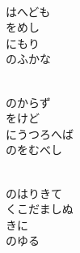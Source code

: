 \documentclass[10pt,b5j]{tarticle} %
\begin{document}
\vspace{1.5em} %
\newcommand{\linespace}{0.5em} %
\newcommand{\blocksize}{0.5\hsize} %
\newcommand{\itemmargin}{3em} %
\begin{enumerate} %
    \setlength{\itemindent}{\itemmargin} %
    \begin{minipage}[c]{\blocksize}
    
        \vspace{\linespace}
        \item~\\
        はへども\\
        をめし\\
        にもり\\
        のふかな
        
    \end{minipage}
    \begin{minipage}[c]{\blocksize}
        
        \vspace{\linespace}
        \item~\\
        のからず\\
        をけど\\
        にうつろへば\\
        のをむべし
        
    \end{minipage}
    \begin{minipage}[c]{\blocksize}
        
        \vspace{\linespace}
        \item~\\
        のはりきて\\
        くこだましぬ\\
        きに\\
        のゆる
        
    \end{minipage}
    \begin{minipage}[c]{\blocksize}
        

\end{minipage}
\end{enumerate}
\end{document}
